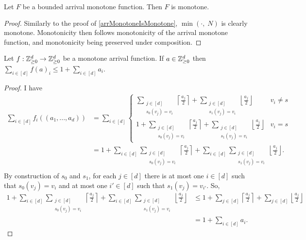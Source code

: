   \begin{lemma}
    Let $F$ be a bounded arrival monotone function. Then $F$ is monotone.
  \end{lemma}
  \begin{proof}
    Similarly to the proof of \cref{arrMonotoneIsMonotone}, $\min(\cdot, \; N)$ is clearly monotone.
    Monotonicity then follows monotonicity of the arrival monotone function, and monotonicity
    being preserved under composition.
  \end{proof}
  \begin{lemma}\label{upOne}
    Let $f : \mathbb{Z}_{\geq 0}^d \to \mathbb{Z}_{\geq 0}^d$ be a monotone arrival function. If $a \in \mathbb{Z}_{\geq 0}^d$ then
    $\sum_{i \in [d]} f(a)_i \leq 1 + \sum_{i \in [d]} a_i$.
  \end{lemma}
  \begin{proof}
    I have 
    \begin{align*}
      \sum_{i \in [d]} f_i ((a_1, ..., a_d)) &= \sum_{i \in [d]} \begin{cases}
    \sum_{\substack{j \in [d] \\ s_0(v_j) = v_i}} \left\lceil \frac{a_j}{2} \right\rceil
      + \sum_{\substack{j \in [d] \\ s_1(v_j) = v_i}} \left\lfloor \frac{a_j}{2} \right\rfloor
      & v_i \neq s \\
    1 + \sum_{\substack{j \in [d] \\ s_0(v_j) = v_i}} \left\lceil \frac{a_j}{2} \right\rceil
      + \sum_{\substack{j \in [d] \\ s_1(v_j) = v_i}} \left\lfloor \frac{a_j}{2} \right\rfloor
      & v_i = s 
    \end{cases}\\
        &= 1 + \sum_{i \in [d]} \sum_{\substack{j \in [d] \\ s_0(v_j) = v_i}}  \left\lceil \frac{a_j}{2} \right\rceil
      + \sum_{i \in [d]} \sum_{\substack{j \in [d] \\ s_1(v_j) = v_i}} \left\lfloor \frac{a_j}{2} \right\rfloor. \\
    \end{align*}
    By construction of $s_0$ and $s_1$, for each $j \in [d]$ there is at most one
    $i \in [d]$ such that $s_0(v_j) = v_i$ and at most one $i' \in [d]$ such that $s_1(v_j) = v_{i'}$.
    So,
    \begin{align*}
        1 + \sum_{i \in [d]} \sum_{\substack{j \in [d] \\ s_0(v_j) = v_i}}  \left\lceil \frac{a_j}{2} \right\rceil
      + \sum_{i \in [d]} \sum_{\substack{j \in [d] \\ s_1(v_j) = v_i}} \left\lfloor \frac{a_j}{2} \right\rfloor
      &\leq 1 + \sum_{j \in [d]} \left\lceil \frac{a_j}{2} \right\rceil + \sum_{j \in [d]} \left\lfloor \frac{a_j}{2} \right\rfloor \\
      &= 1 + \sum_{i \in [d]} a_i. 
    \end{align*}
  \end{proof}
